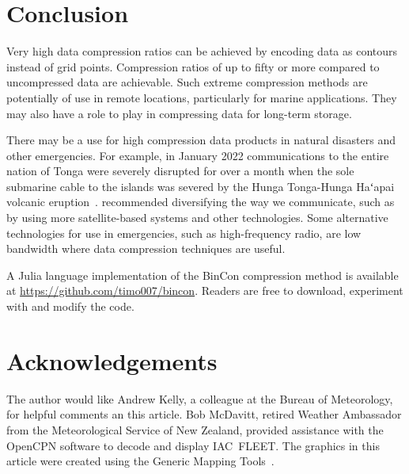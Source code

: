 \documentclass[12pt,a4paper]{article}
\newcommand{\f}{{\fontspec{LibertinusSerif}ʻ}}
\begin{document}
\section*{Conclusion}
\label{sec:conclusion}

Very high data compression ratios can be achieved by encoding data as contours
instead of grid points. Compression ratios of up to fifty or more compared to
uncompressed data are achievable. Such extreme compression methods are
potentially of use in remote locations, particularly for marine applications.
They may also have a role to play in compressing data for long-term storage.

There may be a use for high compression data products in natural disasters and
other emergencies. For example, in January 2022 communications to the
entire nation of Tonga were severely disrupted for over a month when the sole
submarine cable to the islands was severed by the Hunga Tonga-Hunga Ha\f apai
volcanic eruption~\citep{dominey-howes2022}. \citeauthor{dominey-howes2022}
recommended diversifying the way we communicate, such as by using more
satellite-based systems and other technologies. Some alternative
technologies for use in emergencies, such as high-frequency radio, are low
bandwidth where data compression techniques are useful.

A Julia language implementation of the BinCon compression method is available
at \url{https://github.com/timo007/bincon}. Readers are free to download,
experiment with and modify the code.

\section*{Acknowledgements}
\label{sec:acknowledgements}

The author would like Andrew Kelly, a colleague at the Bureau of Meteorology,
for helpful comments an this article. Bob McDavitt, retired Weather Ambassador
from the Meteorological Service of New Zealand, provided assistance with the
OpenCPN software to decode and display IAC~FLEET. The graphics in this article
were created using the Generic Mapping Tools~\citep{wessel_etal2019}.
\end{document}

